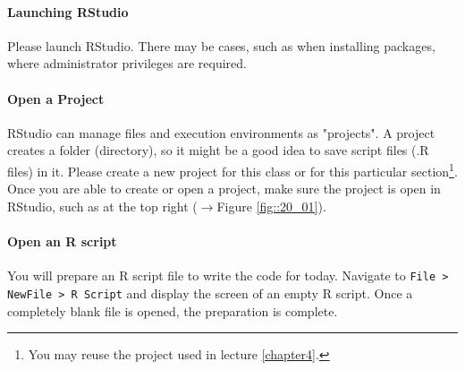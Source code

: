 \documentclass{ltjsbook}
\begin{document}
\paragraph{Launching RStudio} Please launch RStudio. There may be cases, such as when installing packages, where administrator privileges are required.
\paragraph{Open a Project}
RStudio can manage files and execution environments as "projects". A project creates a folder (directory), so it might be a good idea to save script files (.R files) in it. Please create a new project for this class or for this particular section\footnote{You may reuse the project used in lecture \ref{chapter4}.}. Once you are able to create or open a project, make sure the project is open in RStudio, such as at the top right ($\to$Figure \ref{fig::20_01}).


\paragraph{Open an R script} You will prepare an R script file to write the code for today. Navigate to \verb|File > NewFile > R Script| and display the screen of an empty R script. Once a completely blank file is opened, the preparation is complete.

\end{document}
